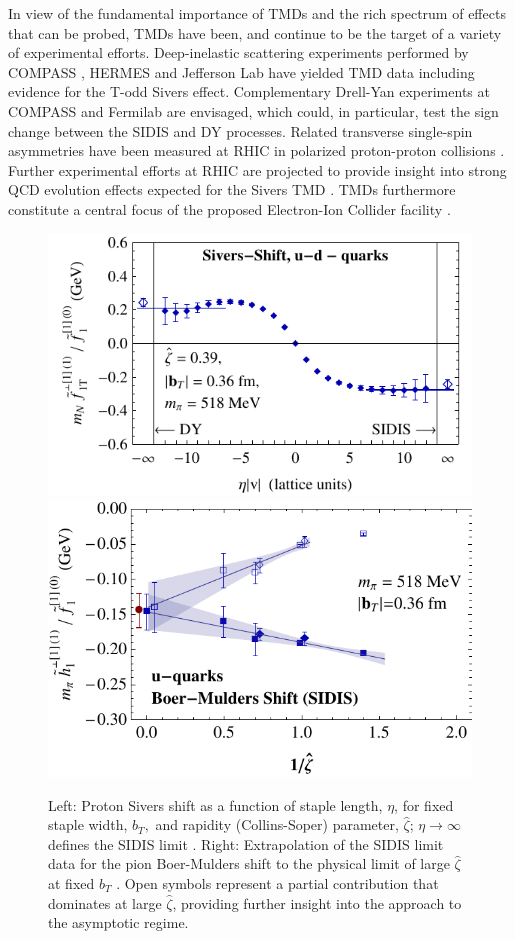 In view of the fundamental importance of TMDs and the rich spectrum of
effects that can be probed, TMDs have been, and continue to be the
target of a variety of experimental efforts. Deep-inelastic scattering
experiments performed by COMPASS \cite{Alekseev:2008aa,Adolph:2014fjw},
HERMES \cite{Airapetian:2009ae,Airapetian:2013bim} and Jefferson Lab
\cite{Qian:2011py,Avakian:2010ae} have yielded TMD data including evidence
for the T-odd Sivers effect. Complementary Drell-Yan experiments at
COMPASS \cite{Gautheron:2010wva} and Fermilab \cite{Brown:2014sea} are
envisaged, which could, in particular, test the sign change between
the SIDIS and DY processes. Related transverse single-spin
asymmetries have been measured at RHIC in polarized proton-proton
collisions \cite{Adare:2013ekj,Adamczyk:2012xd}. Further experimental
efforts at RHIC are projected to provide insight into strong QCD evolution
effects expected for the Sivers TMD \cite{Echevarria:2014vda}.
TMDs furthermore constitute a central focus of the proposed Electron-Ion
Collider facility \cite{Accardi:2012qut}.

\begin{figure}[h!]
	\centering
	\includegraphics[width=0.474\columnwidth]{figures/m020_run38_UminusD_Sivers_lsqr-9_zetasqrlat4}\hspace{1cm}
	\includegraphics[width=0.45\columnwidth]{figures/new_bm_u_sidis_b0p36_vszetahat_extrap_pow1}
	\caption{Left: Proton Sivers shift as a function of staple length, $\eta$, for fixed
		staple width, $b_T, $ and rapidity (Collins-Soper) parameter, $\hat{\zeta }$;
		$\eta \rightarrow \infty $ defines the SIDIS limit \cite{Musch:2011er}.
		Right: Extrapolation of the SIDIS limit data for the pion Boer-Mulders
		shift to the physical limit of large $\hat{\zeta }$
		at fixed $b_T $ \cite{Engelhardt:2015xja}. Open symbols represent a partial
		contribution that dominates at large $\hat{\zeta } $, providing further
		insight into the approach to the asymptotic regime.}
	\label{fig_sidis}
\end{figure}

